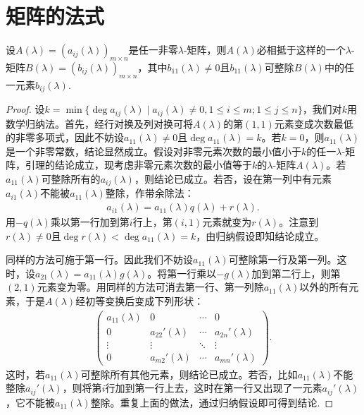 \documentclass[../../main.tex]{subfiles}%
\begin{document}
\section{矩阵的法式}

\begin{lemma}\label{lemma:lambda矩阵一定相抵于b_11整除所有元素的矩阵}
设$A(\lambda)=(a_{ij}(\lambda))_{m\times n}$是任一非零$\lambda$-矩阵，则$A(\lambda)$必相抵于这样的一个$\lambda$-矩阵$B(\lambda)=(b_{ij}(\lambda))_{m\times n}$，其中$b_{11}(\lambda)\neq 0$且$b_{11}(\lambda)$可整除$B(\lambda)$中的任一元素$b_{ij}(\lambda)$.
\end{lemma}
\begin{proof}

设$k = \min\{\deg a_{ij}(\lambda)\mid a_{ij}(\lambda)\neq 0, 1\leqslant  i\leqslant  m; 1\leqslant  j\leqslant  n\}$，我们对$k$用数学归纳法。首先，经行对换及列对换可将$A(\lambda)$的第$(1,1)$元素变成次数最低的非零多项式，因此不妨设$a_{11}(\lambda)\neq 0$且$\deg a_{11}(\lambda)=k$。若$k = 0$，则$a_{11}(\lambda)$是一个非零常数，结论显然成立。假设对非零元素次数的最小值小于$k$的任一$\lambda$-矩阵，引理的结论成立，现考虑非零元素次数的最小值等于$k$的$\lambda$-矩阵$A(\lambda)$。若$a_{11}(\lambda)$可整除所有的$a_{ij}(\lambda)$，则结论已成立。若否，设在第一列中有元素$a_{i1}(\lambda)$不能被$a_{11}(\lambda)$整除，作带余除法：
\begin{align*}
a_{i1}(\lambda)=a_{11}(\lambda)q(\lambda)+r(\lambda).
\end{align*}
用$-q(\lambda)$乘以第一行加到第$i$行上，第$(i,1)$元素就变为$r(\lambda)$。注意到$r(\lambda)\neq 0$且$\deg r(\lambda)<\deg a_{11}(\lambda)=k$，由归纳假设即知结论成立。

同样的方法可施于第一行。因此我们不妨设$a_{11}(\lambda)$可整除第一行及第一列。这时，设$a_{21}(\lambda)=a_{11}(\lambda)g(\lambda)$。将第一行乘以$-g(\lambda)$加到第二行上，则第$(2,1)$元素变为零。用同样的方法可消去第一行、第一列除$a_{11}(\lambda)$以外的所有元素，于是$A(\lambda)$经初等变换后变成下列形状：
\begin{align*}
\begin{pmatrix}
a_{11}(\lambda)&0&\cdots&0\\
0&a_{22}'(\lambda)&\cdots&a_{2n}'(\lambda)\\
\vdots&\vdots&\ddots&\vdots\\
0&a_{m2}'(\lambda)&\cdots&a_{mn}'(\lambda)
\end{pmatrix}.
\end{align*}
这时，若$a_{11}(\lambda)$可整除所有其他元素，则结论已成立。若否，比如$a_{11}(\lambda)$不能整除$a_{ij}'(\lambda)$，则将第$i$行加到第一行上去，这时在第一行又出现了一元素$a_{ij}'(\lambda)$，它不能被$a_{11}(\lambda)$整除。重复上面的做法，通过归纳假设即可得到结论.

\end{proof}
\end{document}
